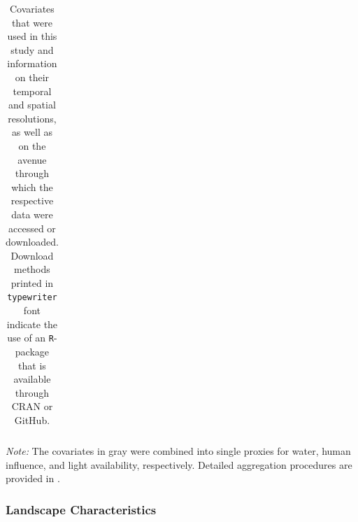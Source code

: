 \documentclass[abstract=on,10pt,a4paper,bibliography=totocnumbered]{article}
\begin{document}
\onehalfspacing
\begin{table}[htbp]
 \begin{center}
    \caption{Covariates that were used in this study and information on their
    temporal and spatial resolutions, as well as on the avenue through which the
    respective data were accessed or downloaded. Download methods printed in
    \texttt{typewriter} font indicate the use of an \texttt{R}-package that is
    available through CRAN or GitHub.}
    \label{CovariatesCH3}
   \begin{threeparttable}
    \begin{tabular}{lcr}
      
    \end{tabular}
    \begin{tablenotes}
      \item \textit{Note:} The covariates in gray were combined into single
      proxies for water, human influence, and light availability, respectively.
      Detailed aggregation procedures are provided in \citet{Hofmann.2021}.
    \end{tablenotes}
   \end{threeparttable}
 \end{center}
\end{table}
\doublespacing

\subsubsection{Landscape Characteristics}
\end{document}
